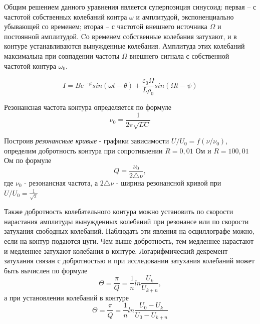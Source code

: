 \documentclass[a4paper]{article}
\begin{document}
\par Общим решением данного уравнения является суперпозиция синусоид: первая -- с частотой собственных колебаний контра $ \omega $ и амплитудой, экспоненциально убывающей со временем; вторая -- с частотой внешнего источника $ \Omega $ и постоянной амплитудой. Cо временем собственные колебания затухают, и в контуре устанавливаются вынужденные колебания. Амплитуда этих колебаний максимальна при совпадении частоты $ \Omega $ внешнего сигнала с собственной частотой контура $ \omega_0 $. 

\[ I = B e^{-\gamma t} sin(\omega t -\theta) + \frac{\varepsilon_0 \Omega}{L \rho_0} sin(\Omega t -\psi) \]


Резонансная частота контура определяется по формуле 
\begin{equation}
    \nu_0 = \frac{1}{2\pi \sqrt{LC}}
\end{equation}

Построив \textit{резонансные кривые} - графики зависимости $U/U_0 = f (\nu / \nu_0)$, определим добротность контура при сопротивлении $R = 0,01$ Ом и $R = 100,01$ Ом по формуле 
\begin{equation}
    Q = \frac{\nu_0}{2\triangle \nu},
\end{equation}
    где $\nu_0$ - резонансная частота, а $2\triangle \nu$ - ширина резонансной кривой при $U/U_0 = \frac{1}{\sqrt{2}}$ 
    
Также добротность колебательного контура можно установить по скорости нарастания амплитуды вынужденных колебаний при резонансе или по скорости затухания свободных колебаний. Наблюдать эти явления на осциллографе можно, если на контур подаются цуги. Чем выше добротность, тем медленнее нарастают и медленнее затухают колебания в контуре.
Логарифмический декремент затухания связан с добротностью и при исследовании затухания колебаний может быть вычислен по формуле 
\begin{equation}
    \Theta = \frac{\pi}{Q} = \frac{1}{n} ln \frac{U_k}{U_{k+n}},
\end{equation}
а при установлении колебаний в контуре
\begin{equation}
    \Theta = \frac{\pi}{Q} = \frac{1}{n} ln \frac{U_0 - U_k}{U_0 - U_{k+n}}
\end{equation}
\end{document}
